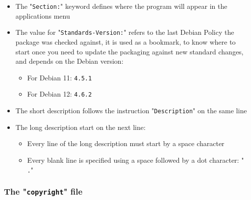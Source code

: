 \begin{itemize}
\item The "\texttt{Section:}" keyword defines where the program will appear in the applications menu
\item The value for "\texttt{Standards-Version:}" refers to the last Debian Policy the package was checked against, 
it is used as a bookmark, to know where to start once you need to update the packaging against new standard changes, and depends on the Debian version:
\begin{itemize} 
\item For Debian 11: \texttt{4.5.1}
\item For Debian 12: \texttt{4.6.2}
\end{itemize}
\item The short description follows the instruction "\texttt{Description}" on the same line
\item The long description start on the next line: 
\begin{itemize}
\item Every line of the long description must start by a space character
\item Every blank line is specified using a space followed by a dot character: "\texttt{ .}"
\end{itemize}
\end{itemize}

\subsubsection{The "\texttt{copyright}" file}

